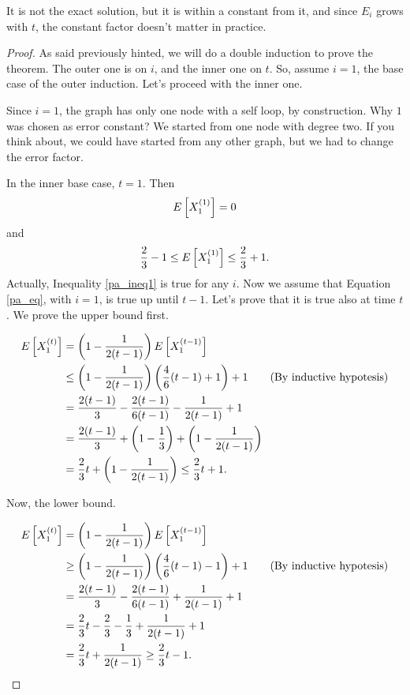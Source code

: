 It is not the exact solution, but it is within a constant from it, and since $E_i$ grows with $t$, the constant factor doesn't matter in practice.
\begin{proof}
As said previously hinted, we will do a double induction to prove the theorem. The outer one is on $i$, and the inner one on $t$. So, assume $i = 1$, the base case of the outer induction. Let's proceed with the inner one.

Since $i = 1$, the graph has only one node with a self loop, by construction. Why $1$ was chosen as error constant? We started from one node with degree two. If you think about, we could have started from any other graph, but we had to change the error factor.
 
In the inner base case, $t = 1$. Then
\begin{equation}
	E\left[X_1^{(1)}\right] = 0
\end{equation}
and
\begin{equation}\label{pa_ineq1}
	\frac{2}{3} - 1 \leq E\left[X_1^{(1)}\right] \leq \frac{2}{3} + 1.
\end{equation}
Actually, Inequality \ref{pa_ineq1} is true for any $i$. Now we assume that Equation \ref{pa_eq}, with $i=1$, is true up until $t-1$. Let's prove that it is true also at time $t$. We prove the upper bound first.

\begin{align}
E\left[X_1^{(t)}\right] &= \left(1 - \frac{1}{2(t-1)}\right)E\left[X_1^{(t-1)}\right]\\
&\leq \left(1 - \frac{1}{2(t-1)}\right)\left(\frac{4}{6}(t-1) + 1\right) + 1\tag{By inductive hypotesis}\\
&=\frac{2(t-1)}{3} -\frac{2(t-1)}{6(t-1)} - \frac{1}{2(t-1)} + 1\\
&=\frac{2(t-1)}{3} + \left(1 - \frac{1}{3}\right) + \left(1 - \frac{1}{2(t-1)}\right)\\
&=\frac{2}{3}t + \left(1 -\frac{1}{2(t-1)}\right) \leq \frac{2}{3}t + 1.
\end{align}

Now, the lower bound.


\begin{align}
E\left[X_1^{(t)}\right] &= \left(1 - \frac{1}{2(t-1)}\right)E\left[X_1^{(t-1)}\right]\\
&\geq \left(1 - \frac{1}{2(t-1)}\right)\left(\frac{4}{6}(t-1) - 1\right) + 1\tag{By inductive hypotesis} \\
&=\frac{2(t-1)}{3} -\frac{2(t-1)}{6(t-1)} + \frac{1}{2(t-1)} + 1\\
&=\frac{2}{3}t - \frac{2}{3} -\frac{1}{3} + \frac{1}{2(t-1)} + 1\\
&=\frac{2}{3}t + \frac{1}{2(t-1)} \geq \frac{2}{3}t - 1.
\end{align}


\end{proof}

